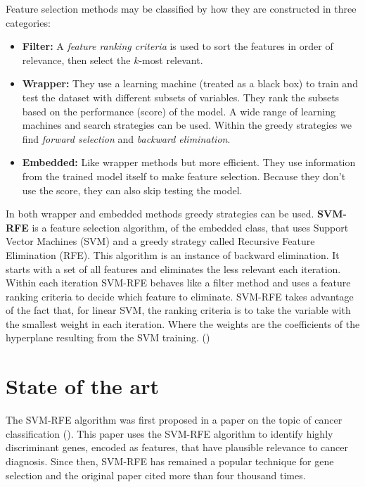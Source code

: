 Feature selection methods may be classified by how they are constructed in three categories:

\begin{itemize}
    \item \textbf{Filter:} A \emph{feature ranking criteria} is used to sort the features in order of relevance, then select the $k$-most relevant.
    \item \textbf{Wrapper:} They use a learning machine (treated as a black box) to train and test the dataset with different subsets of variables. They rank the subsets based on the performance (score) of the model. A wide range of learning machines and search strategies can be used. Within the greedy strategies we find \emph{forward selection} and \emph{backward elimination}.
    \item \textbf{Embedded:} Like wrapper methods but more efficient. They use information from the trained model itself to make feature selection. Because they don't use the score, they can also skip testing the model.
\end{itemize}

In both wrapper and embedded methods greedy strategies can be used. \textbf{SVM-RFE} is a feature selection algorithm, of the embedded class, that uses Support Vector Machines (SVM) and a greedy strategy called Recursive Feature Elimination (RFE). This algorithm is an instance of backward elimination. It starts with a set of all features and eliminates the less relevant each iteration. Within each iteration SVM-RFE behaves like a filter method and uses a feature ranking criteria to decide which feature to eliminate. SVM-RFE takes advantage of the fact that, for linear SVM, the ranking criteria is to take the variable with the smallest weight in each iteration. Where the weights are the co\-ef\-fi\-cients of the hyperplane resulting from the SVM training.  (\cite{guyon_introduction_2003})


\section{State of the art}

The SVM-RFE algorithm was first proposed in a paper on the topic of cancer class\-ification (\cite{guyon_gene_2002}). This paper uses the SVM-RFE algorithm to identify highly discriminant genes, encoded as features, that have plausible relevance to cancer diagnosis. Since then, SVM-RFE has remained a popular technique for gene selection and the original paper cited more than four thousand times.

